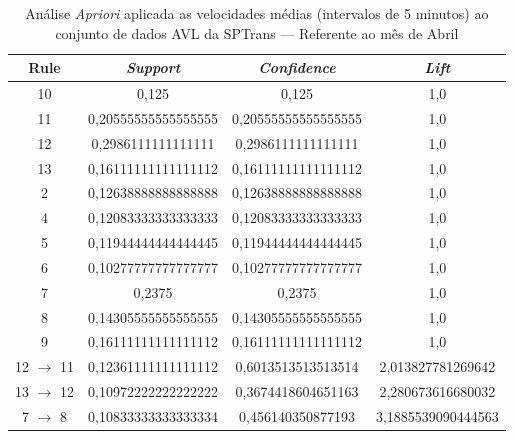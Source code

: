 \documentclass[
	12pt,				%
	oneside,			%
	a4paper,			%
	english,			%
	brazil				%
	]{abntex2ppgsi}
\begin{document}
\begin{apendicesenv}
\begin{table}[!htb]
\centering
\caption {Análise \textit{Apriori} aplicada as velocidades médias (intervalos de 5 minutos) ao conjunto de dados AVL da SPTrans --- Referente ao mês de Abril}
\label {tab:aprioriApril}
\begin{tabular}{c|c|c|c}
\hline
\textbf{Rule} & \textit{\textbf{Support}} & \textit{\textbf{Confidence}} & \textit{\textbf{Lift}} \\
\hline 
10 &  0,125 &  0,125 &  1,0\\
\hline
11 &  0,20555555555555555 &  0,20555555555555555 &  1,0\\
\hline
12 &  0,2986111111111111 &  0,2986111111111111 &  1,0\\
\hline
13 &  0,16111111111111112 &  0,16111111111111112 &  1,0\\
\hline
2 &  0,12638888888888888 &  0,12638888888888888 &  1,0\\
\hline
4 &  0,12083333333333333 &  0,12083333333333333 &  1,0\\
\hline
5 &  0,11944444444444445 &  0,11944444444444445 &  1,0\\
\hline
6 &  0,10277777777777777 &  0,10277777777777777 &  1,0\\
\hline
7 &  0,2375 &  0,2375 &  1,0\\
\hline
8 &  0,14305555555555555 &  0,14305555555555555 &  1,0\\
\hline
9 &  0,16111111111111112 &  0,16111111111111112 &  1,0\\
\hline
12  $\rightarrow$ 11 &  0,12361111111111112 &  0,6013513513513514 &  2,013827781269642\\
\hline
13  $\rightarrow$ 12 &  0,10972222222222222 &  0,3674418604651163 &  2,280673616680032\\
\hline
7  $\rightarrow$ 8 &  0,10833333333333334 &  0,456140350877193 &  3,1885539090444563\\
\hline
\end{tabular}
\end{table}


\end{apendicesenv}
\end{document}
